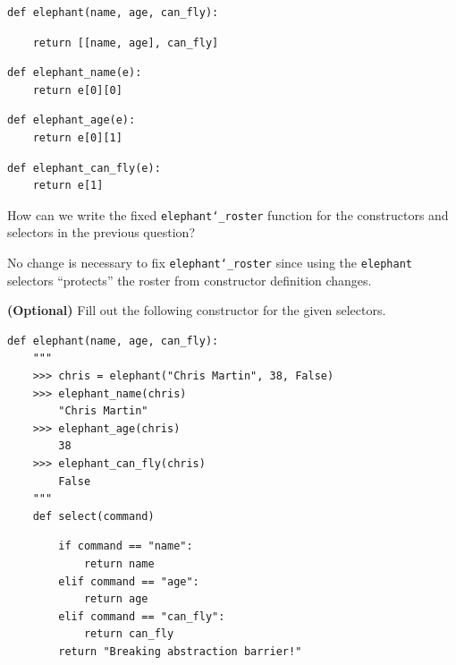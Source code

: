 \documentclass{exam}
\begin{document}
\begin{questions}
\begin{blocksection}
\begin{lstlisting}
def elephant(name, age, can_fly):
\end{lstlisting}
\begin{solution}[1in]
\begin{lstlisting}
    return [[name, age], can_fly]
\end{lstlisting}
\end{solution}

\begin{lstlisting}
def elephant_name(e):
    return e[0][0]
\end{lstlisting}

\begin{lstlisting}
def elephant_age(e):
    return e[0][1]
\end{lstlisting}

\begin{lstlisting}
def elephant_can_fly(e):
    return e[1]
\end{lstlisting}

\end{blocksection}


\begin{blocksection}
\question How can we write the fixed \texttt{elephant\char`_roster} function for
the constructors and selectors in the previous question?

\begin{solution}[2in]
No change is necessary to fix \texttt{elephant\char`_roster} since using the
\texttt{elephant} selectors ``protects'' the roster from constructor definition
changes.
\end{solution}

\end{blocksection}

\begin{blocksection}
\question \textbf{(Optional)} Fill out the following constructor for the given
selectors.

\begin{lstlisting}
def elephant(name, age, can_fly):
    """
    >>> chris = elephant("Chris Martin", 38, False)
    >>> elephant_name(chris)
        "Chris Martin"
    >>> elephant_age(chris)
        38
    >>> elephant_can_fly(chris)
        False
    """
    def select(command)
\end{lstlisting}
\begin{solution}[3in]
\begin{lstlisting}
        if command == "name":
            return name
        elif command == "age":
            return age
        elif command == "can_fly":
            return can_fly
        return "Breaking abstraction barrier!"
\end{lstlisting}
\end{solution}


\end{blocksection}
\end{questions}
\end{document}
